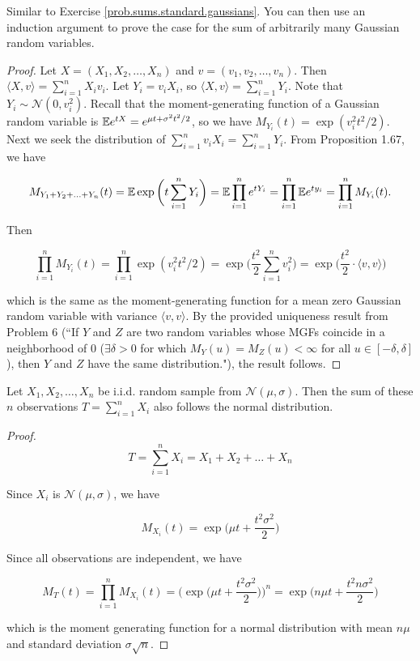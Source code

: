  \begin{remark} Similar to Exercise \ref{prob.sums.standard.gaussians}. You can then use an induction argument to prove the case for the sum of arbitrarily many Gaussian random variables.
\end{remark}

\begin{proof} Let \(X = (X_1, X_2, \ldots, X_n)\) and \(v = (v_1, v_2, \ldots, v_n)\). Then \(\langle X, v \rangle = \sum_{i=1}^n X_i v_i\). Let \(Y_i = v_i X_i\), so  \(\langle X, v \rangle = \sum_{i=1}^n Y_i\). Note that \(Y_i \sim \mathcal{N}(0, v_i^2)\). Recall that the moment-generating function of a Gaussian random variable is \(\E e^{tX} =   e^{\mu t + \sigma^2t^2/2}\), so we have \(M_{Y_i}(t) = \exp( v_i^2t^2/2)\).  Next we seek the distribution of \(\sum_{i=1}^n v_i X_i = \sum_{i=1}^n Y_i \). From Proposition 1.67, we have

\[
M_{Y_1 + Y_2 + \ldots + Y_n}(t)  = \E \exp \bigg(t \sum_{i=1}^n Y_i \bigg) =  \E \prod_{i=1}^n e^{tY_i} =\prod_{i=1}^n   \E e^{ty_i} = \prod_{i=1}^n M_{Y_i}(t).
\]

Then

\[
\prod_{i=1}^n M_{Y_i}(t) = \prod_{i=1}^n  \exp( v_i^2t^2/2)= \exp \bigg( \frac{t^2}{2} \sum_{i=1}^n v_i^2\bigg) = \exp \bigg( \frac{t^2}{2} \cdot \langle v, v \rangle \bigg)
\]

which is the same as the moment-generating function for a mean zero Gaussian random variable with variance \(\langle v, v \rangle\). By the provided uniqueness result from Problem 6 (``If $Y$ and $Z$ are two random variables whose MGFs coincide in a neighborhood of 0 ($\exists \delta>0$ for which $M_Y(u) =M_Z(u) < \infty$ for all $u\in[-\delta,\delta]$), then $Y$ and $Z$ have the same distribution."), the result follows. 

\end{proof}

\begin{proposition} Let \(X_1, X_2, \ldots , X_n\) be i.i.d. random sample from \(\mathcal{N}(\mu, \sigma)\). Then the sum of these \(n\) observations \(T = \sum_{i=1}^n X_i\) also follows the normal distribution. 

\end{proposition}

\begin{proof}

\[
T = \sum_{i=1}^n X_i = X_1 + X_2 + \ldots + X_n
\]

Since \(X_i\) is \(\mathcal{N}(\mu, \sigma)\), we have 

\[
M_{X_i}(t) = \exp\bigg(\mu t + \frac{t^2 \sigma^2}{2} \bigg)
\]

Since all observations are independent, we have

\[
M_T(t) = \prod_{i=1}^n M_{X_i}(t) = \bigg(\exp\bigg(\mu t + \frac{t^2 \sigma^2}{2} \bigg)\bigg)^n = \boxed{\exp\bigg(n \mu t + \frac{t^2 n \sigma^2}{2} \bigg)}
\]

which is the moment generating function for a normal distribution with mean \(n \mu\) and standard deviation \(\sigma \sqrt{n}\).

\end{proof}




